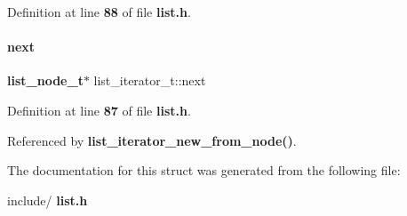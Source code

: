 Definition at line \textbf{ 88} of file \textbf{ list.\+h}.

\mbox{\label{structlist__iterator__t_adfc911fa0f601936c4a58c95a08737ee}} 
\paragraph{next}
{\footnotesize\ttfamily \textbf{ list\+\_\+node\+\_\+t}$\ast$ list\+\_\+iterator\+\_\+t\+::next}



Definition at line \textbf{ 87} of file \textbf{ list.\+h}.



Referenced by \textbf{ list\+\_\+iterator\+\_\+new\+\_\+from\+\_\+node()}.



The documentation for this struct was generated from the following file\+:\begin{DoxyCompactItemize}
\item 
include/\textbf{ list.\+h}\end{DoxyCompactItemize}
